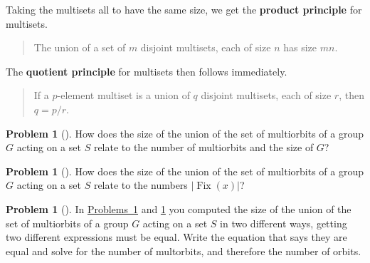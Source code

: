 \documentclass[10pt,]{book}
\newcommand{\terminology}[1]{\textbf{#1}}
\theoremstyle{plain}
\theoremstyle{definition}
\newtheorem{activity}[project]{Problem}
\theoremstyle{definition}
\numberwithin{equation}{chapter}
\DeclareMathOperator{\Fix}{Fix}
\begin{document}
Taking the multisets all to have the same size, we get the \terminology{product principle} for multisets. %
\begin{quote}\hypertarget{blockquote-15}{}
The union of a set of \(m\) disjoint multisets, each of size \(n\) has size \(mn\).%
\end{quote}
The \terminology{quotient principle} for multisets then follows immediately.%
\begin{quote}\hypertarget{blockquote-16}{}
If a \(p\)-element multiset is a union of \(q\) disjoint multisets, each of size \(r\), then \(q = p/r\).%
\end{quote}
\begin{activity}[] \label{union-multiorbit-size}
How does the size of the union of the set of multiorbits of a group \(G\) acting on a set \(S\) relate to the number of multiorbits and the size of \(G\)?%
\end{activity}
\begin{activity}[] \label{union-multiorbit-fix}
How does the size of the union of the set of multiorbits of a group \(G\) acting on a set \(S\) relate to the numbers \(|\Fix(x)|\)?%
\end{activity}
\begin{activity}[] \label{numbermultiorbits3}
In \hyperref[union-multiorbit-size]{Problems~\ref{union-multiorbit-size}} and \hyperref[union-multiorbit-fix]{\ref{union-multiorbit-fix}} you computed the size of the union of the set of multiorbits of a group \(G\) acting on a set \(S\) in two different ways, getting two different expressions must be equal. Write the equation that says they are equal and solve for the number of multorbits, and therefore the number of orbits.%
\end{activity}
\typeout{************************************************}
\typeout{************************************************}
\end{document}
